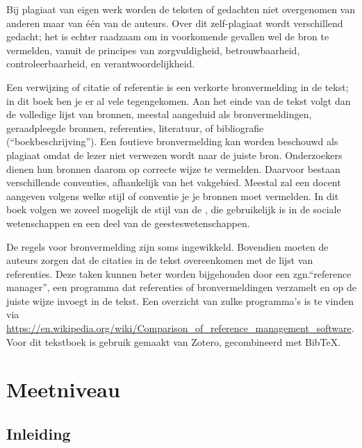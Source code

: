 \documentclass[
]{book}
\begin{document}
Bij plagiaat van eigen werk worden de teksten of gedachten niet
overgenomen van anderen maar van één van de auteurs. Over dit
zelf-plagiaat wordt verschillend gedacht; het is echter raadzaam om in
voorkomende gevallen wel de bron te vermelden, vanuit de principes van
zorgvuldigheid, betrouwbaarheid, controleerbaarheid, en
verantwoordelijkheid.

Een verwijzing of citatie of referentie is een verkorte bronvermelding
in de tekst; in dit boek ben je er al vele tegengekomen. Aan het
einde van de tekst volgt dan de volledige
lijst van bronnen, meestal aangeduid als bronvermeldingen, geraadpleegde
bronnen, referenties, literatuur, of bibliografie (``boekbeschrijving'').
Een foutieve bronvermelding kan worden beschouwd als plagiaat \citep{UBVU15}
omdat de lezer niet verwezen wordt naar de juiste bron. Onderzoekers
dienen hun bronnen daarom op correcte wijze te vermelden. Daarvoor
bestaan verschillende conventies, afhankelijk van het vakgebied. Meestal
zal een docent aangeven volgens welke stijl of conventie je je bronnen
moet vermelden. In dit boek volgen we zoveel mogelijk de stijl van de \citep{APA10}, die
gebruikelijk is in de sociale wetenschappen en een deel van de
geesteswetenschappen.

De regels voor bronvermelding zijn soms ingewikkeld. Bovendien moeten de
auteurs zorgen dat de citaties in de tekst overeenkomen met de lijst van
referenties. Deze taken kunnen beter worden bijgehouden door een
zgn.``reference manager'', een programma dat referenties of
bronvermeldingen verzamelt en op de juiste wijze invoegt in de tekst.
Een overzicht van zulke programma's is te vinden via
\url{https://en.wikipedia.org/wiki/Comparison_of_reference_management_software}.
Voor dit tekstboek is gebruik gemaakt van Zotero,
gecombineerd met BibTeX.

\hypertarget{ch:Meetniveau}{%
\chapter{Meetniveau}\label{ch:Meetniveau}}

\hypertarget{inleiding-1}{%
\section{Inleiding}\label{inleiding-1}}
\end{document}
